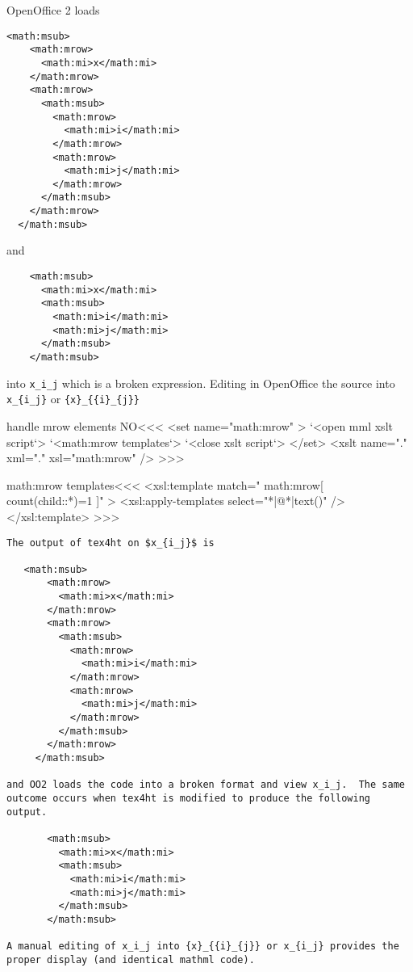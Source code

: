 \documentclass{article}
\begin{document}
OpenOffice 2 loads

\begin{verbatim}
<math:msub> 
    <math:mrow> 
      <math:mi>x</math:mi> 
    </math:mrow> 
    <math:mrow> 
      <math:msub> 
        <math:mrow> 
          <math:mi>i</math:mi> 
        </math:mrow> 
        <math:mrow> 
          <math:mi>j</math:mi> 
        </math:mrow> 
      </math:msub> 
    </math:mrow> 
  </math:msub> 
\end{verbatim}

and 
 
\begin{verbatim}
    <math:msub>  
      <math:mi>x</math:mi>  
      <math:msub>  
        <math:mi>i</math:mi>  
        <math:mi>j</math:mi>  
      </math:msub>  
    </math:msub>  
\end{verbatim}

into \verb'x_i_j' which is a broken expression. Editing in OpenOffice the source
into 
\verb'x_{i_j}'
or
\verb'{x}_{{i}_{j}}'








\<handle mrow elements NO\><<<
<set name="math:mrow" >
   `<open mml xslt script`>
   `<math:mrow templates`>
   `<close xslt script`>
</set>
<xslt name="." xml="." xsl="math:mrow" />
>>>





\<math:mrow templates\><<<
<xsl:template match=" math:mrow[ count(child::*)=1 ]" >
      <xsl:apply-templates select="*|@*|text()" />  
</xsl:template> 
>>>


\begin{verbatim}
The output of tex4ht on $x_{i_j}$ is  
 
   <math:msub> 
       <math:mrow> 
         <math:mi>x</math:mi> 
       </math:mrow> 
       <math:mrow> 
         <math:msub> 
           <math:mrow> 
             <math:mi>i</math:mi> 
           </math:mrow> 
           <math:mrow> 
             <math:mi>j</math:mi> 
           </math:mrow> 
         </math:msub> 
       </math:mrow> 
     </math:msub> 
    
and OO2 loads the code into a broken format and view x_i_j.  The same 
outcome occurs when tex4ht is modified to produce the following output. 
        
       <math:msub> 
         <math:mi>x</math:mi> 
         <math:msub> 
           <math:mi>i</math:mi> 
           <math:mi>j</math:mi> 
         </math:msub> 
       </math:msub> 
 
A manual editing of x_i_j into {x}_{{i}_{j}} or x_{i_j} provides the 
proper display (and identical mathml code). 
\end{verbatim}
\end{document}
